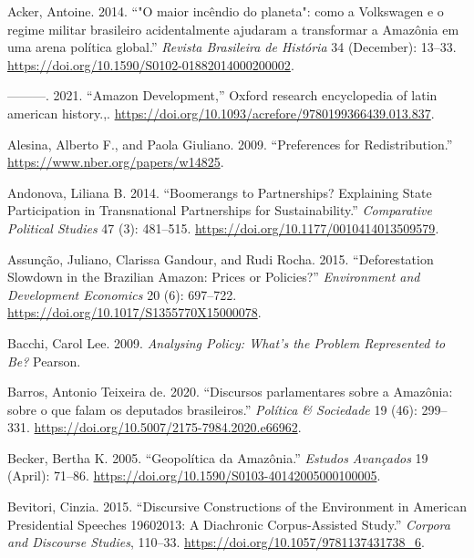 \documentclass[
]{article}
\newlength{\cslhangindent}
\newlength{\cslentryspacingunit} %
\newenvironment{CSLReferences}[2] %
 {%
  \setlength{\parindent}{0pt}
  \ifodd #1
  \let\oldpar\par
  \def\par{\hangindent=\cslhangindent\oldpar}
  \fi
  \setlength{\parskip}{#2\cslentryspacingunit}
 }%
 {}
\begin{document}
\hypertarget{refs}{}
\begin{CSLReferences}{1}{0}
\leavevmode{}%
Acker, Antoine. 2014. {``{"}O maior incêndio do planeta{"}: como a
Volkswagen e o regime militar brasileiro acidentalmente ajudaram a
transformar a Amazônia em uma arena política global.''} \emph{Revista
Brasileira de História} 34 (December): 13--33.
\url{https://doi.org/10.1590/S0102-01882014000200002}.

\leavevmode{}%
---------. 2021. {``Amazon Development,''} Oxford research encyclopedia
of latin american history.,.
\url{https://doi.org/10.1093/acrefore/9780199366439.013.837}.

\leavevmode{}%
Alesina, Alberto F., and Paola Giuliano. 2009. {``Preferences for
Redistribution.''} \url{https://www.nber.org/papers/w14825}.

\leavevmode{}%
Andonova, Liliana B. 2014. {``Boomerangs to Partnerships? Explaining
State Participation in Transnational Partnerships for Sustainability.''}
\emph{Comparative Political Studies} 47 (3): 481--515.
\url{https://doi.org/10.1177/0010414013509579}.

\leavevmode{}%
Assunção, Juliano, Clarissa Gandour, and Rudi Rocha. 2015.
{``Deforestation Slowdown in the Brazilian Amazon: Prices or
Policies?''} \emph{Environment and Development Economics} 20 (6):
697--722. \url{https://doi.org/10.1017/S1355770X15000078}.

\leavevmode{}%
Bacchi, Carol Lee. 2009. \emph{Analysing Policy: What's the Problem
Represented to Be?} Pearson.

\leavevmode{}%
Barros, Antonio Teixeira de. 2020. {``Discursos parlamentares sobre a
Amazônia: sobre o que falam os deputados brasileiros.''} \emph{Política
\& Sociedade} 19 (46): 299--331.
\url{https://doi.org/10.5007/2175-7984.2020.e66962}.

\leavevmode{}%
Becker, Bertha K. 2005. {``Geopolítica da Amazônia.''} \emph{Estudos
Avançados} 19 (April): 71--86.
\url{https://doi.org/10.1590/S0103-40142005000100005}.

\leavevmode{}%
Bevitori, Cinzia. 2015. {``Discursive Constructions of the Environment
in American Presidential Speeches 1960{\textendash}2013: A Diachronic
Corpus-Assisted Study.''} \emph{Corpora and Discourse Studies}, 110--33.
\url{https://doi.org/10.1057/9781137431738_6}.


\end{CSLReferences}
\end{document}
